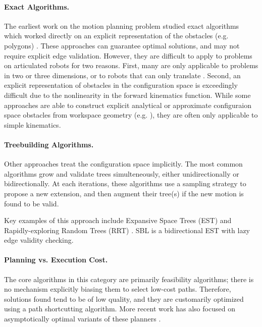 \paragraph{Exact Algorithms.}
The earliest work on the motion planning problem studied exact
algorithms which worked directly on an explicit representation
of the obstacles (e.g. polygons) \citep{lozanoperez1983cspace}.
These approaches can guarantee optimal solutions,
and may not require explicit edge validation.
However,
they are difficult to apply to problems on articulated
robots for two reasons.
First, many are only applicable to problems in two or three dimensions,
or to robots that can only translate \citep{kavraki1995cspacefft}.
Second, an explicit representation of obstacles in the
configuration space is exceedingly difficult due to the
nonlinearity in the forward kinematics function.
While some approaches are able to construct explicit
analytical or approximate configuraion space obstacles from
workspace geometry (e.g. \citep{newmanbranicky1991cspacetransforms}),
they are often only applicable to simple kinematics.

\paragraph{Treebuilding Algorithms.}
Other approaches treat the configuration space implicitly.
The most common algorithms grow and validate trees simulteneously,
either unidirectionally or bidirectionally.
At each iterations,
these algorithms use a sampling strategy to propose a new extension,
and then augment their tree(s) if the new motion is found to be valid.

Key examples of this approach include
Expansive Space Trees (EST) \citep{hsu1997expansive}
and Rapidly-exploring Random Trees (RRT)
\citep{lavalle1998rrt, kuffner2000rrtconnect}.
SBL \citep{sanchezante2001sbl}
is a bidirectional EST with lazy edge validity checking.

\paragraph{Planning vs. Execution Cost.}
The core algorithms in this category are primarily feasibility
algorithms;
there is no mechanism explicitly biasing them to select
low-cost paths.
Therefore, solutions found tend to be of low quality,
and they are customarily optimized using a path shortcutting
algorithm.
More recent work has also focused on asymptotically optimal variants
of these planners \citep{karaman2010rrtstar}.

